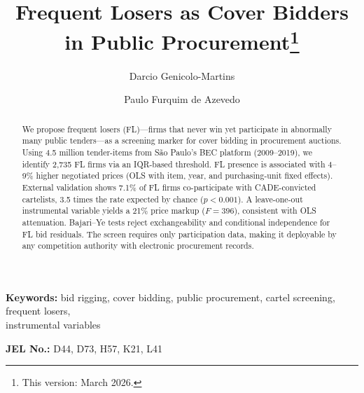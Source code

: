 \begin{frontmatter}

\title{Frequent Losers as Cover Bidders in Public Procurement\texorpdfstring{\footnote{This version: March 2026.}}{}}

\author[insper]{Darcio Genicolo-Martins}
\author[insper]{Paulo Furquim de Azevedo}

\begin{abstract}
We propose frequent losers (FL)---firms that never win yet participate in
abnormally many public tenders---as a screening marker for cover bidding
in procurement auctions. Using 4.5 million tender-items from S\~ao
Paulo's BEC platform (2009--2019), we identify 2,735 FL firms via an
IQR-based threshold. FL presence is associated with 4--9\% higher
negotiated prices (OLS with item, year, and purchasing-unit fixed
effects). External validation shows 7.1\% of FL firms co-participate
with CADE-convicted cartelists, 3.5 times the rate expected by chance
($p < 0.001$). A leave-one-out instrumental variable yields a 21\%
price markup ($F = 396$), consistent with OLS attenuation. Bajari--Ye
tests reject exchangeability and conditional independence for FL bid
residuals. The screen requires only participation data, making it
deployable by any competition authority with electronic procurement
records.
\end{abstract}

\end{frontmatter}

\noindent\textbf{Keywords:} bid rigging, cover bidding, public procurement, cartel screening, frequent losers,\\ instrumental variables

\noindent\textbf{JEL No.:} D44, D73, H57, K21, L41

\bigskip

